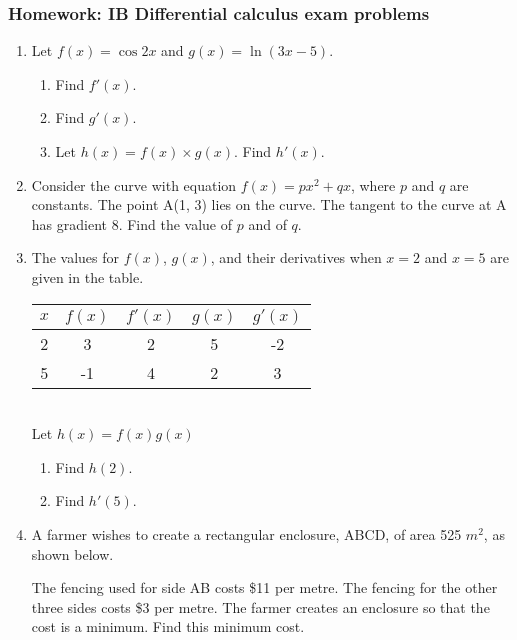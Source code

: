 \documentclass[12pt, twoside]{article}
\begin{document}
\subsubsection*{Homework: IB Differential calculus exam problems}

\begin{enumerate}

\item Let $f(x)=\cos 2x$ and $g(x)=\ln (3x-5)$.
\begin{enumerate}
  \item Find $f'(x)$.
  \item Find $g'(x)$.
  \item Let $h(x) = f(x) \times g(x)$. Find $h'(x)$.
\end{enumerate}

\item Consider the curve with equation $f(x) = px^2 + qx$, where $p$ and $q$ are constants. The point A(1, 3) lies on the curve. The tangent to the curve at A has gradient 8. Find the value of $p$ and of $q$.

\item The values for $f(x)$, $g(x)$, and their derivatives when $x=2$ and $x=5$ are given in the table. \\[0.5cm]
\begin{tabular}{|c|c|c|c|c|}
  \hline
  $x$ & $f(x)$ & $f'(x)$ & $g(x)$ & $g'(x)$ \\
  \hline
  2 & 3 & 2 & 5 & -2 \\
  \hline
  5 & -1 & 4 & 2 & 3 \\
  \hline
\end{tabular}\\[0.5cm]
Let $h(x)=f(x)g(x)$
\begin{enumerate}
  \item Find $h(2)$.
  \item Find $h'(5)$.
\end{enumerate}

\item A farmer wishes to create a rectangular enclosure, ABCD, of area 525 $m^2$, as shown below.
  \begin{figure}[!htbp]
    \begin{center}
    \end{center}
  \end{figure}
  The fencing used for side AB costs \$11 per metre. The fencing for the other three sides costs \$3 per metre. The farmer creates an enclosure so that the cost is a minimum. Find this minimum cost.


\end{enumerate}
\end{document}

